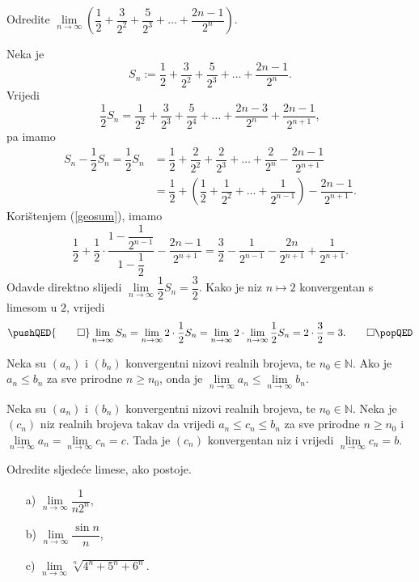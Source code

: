\begin{exercise}
Odredite $\lim\limits_{n\to \infty}\left(\dfrac{1}{2}+\dfrac{3}{2^2}+\dfrac{5}{2^3}+\dots+\dfrac{2n-1}{2^n}\right)$.
\end{exercise}
\begin{proof*}
Neka je
$$S_n:=\dfrac{1}{2}+\dfrac{3}{2^2}+\dfrac{5}{2^3}+\dots+\dfrac{2n-1}{2^n}.$$
Vrijedi
$$\dfrac{1}{2}S_n=\dfrac{1}{2^2}+\dfrac{3}{2^3}+\dfrac{5}{2^4}+\dots+\dfrac{2n-3}{2^{n}}+\dfrac{2n-1}{2^{n+1}},$$
pa imamo
\begin{align*}
S_n-\dfrac{1}{2}S_n=\dfrac{1}{2}S_n&=\dfrac{1}{2}+\dfrac{2}{2^2}+\dfrac{2}{2^3}+\dots+\dfrac{2}{2^n}-\dfrac{2n-1}{2^{n+1}}\\
&=\dfrac{1}{2}+\left(\dfrac{1}{2}+\dfrac{1}{2^2}+\dots+\dfrac{1}{2^{n-1}}\right)-\dfrac{2n-1}{2^{n+1}}.
\end{align*}
Korištenjem (\ref{geosum}), imamo
$$\dfrac{1}{2}+\dfrac{1}{2}\cdot\dfrac{1-\dfrac{1}{2^{n-1}}}{1-\dfrac{1}{2}}-\dfrac{2n-1}{2^{n+1}}=\dfrac{3}{2}-\dfrac{1}{2^{n-1}}-\dfrac{2n}{2^{n+1}}+\dfrac{1}{2^{n+1}}.$$
Odavde direktno slijedi $\lim\limits_{n\to \infty}{\dfrac{1}{2}S_n}=\dfrac{3}{2}$. Kako je niz $n\mapsto 2$ konvergentan s limesom u $2$, vrijedi
\[
\pushQED{\qed}
\lim\limits_{n\to \infty}{S_n}=\lim\limits_{n\to \infty}{2\cdot \dfrac{1}{2}S_n}=\lim\limits_{n\to \infty}{2}\cdot \lim\limits_{n\to \infty}{\dfrac{1}{2}S_n}=2\cdot \dfrac{3}{2}=3.\qedhere
\popQED
\]
\end{proof*}
\begin{remark}
\label{limitpreservesordering}
Neka su $(a_n)$ i $(b_n)$ konvergentni nizovi realnih brojeva, te $n_0\in \mathbb{N}$. Ako je $a_n\leq b_n$ za sve prirodne $n\geq n_0$, onda je $\lim\limits_{n\to \infty}{a_n}\leq \lim\limits_{n\to \infty}{b_n}$.
\end{remark}
\begin{remark} 
Neka su $(a_n)$ i $(b_n)$ konvergentni nizovi realnih brojeva, te $n_0\in \mathbb{N}$. Neka je $(c_n)$ niz realnih brojeva takav da vrijedi $a_n\leq c_n\leq b_n$ za sve prirodne $n\geq n_0$ i $\lim\limits_{n\to \infty}{a_n}=\lim\limits_{n\to \infty}{c_n}=c$. Tada je $(c_n)$ konvergentan niz i vrijedi $\lim\limits_{n\to \infty}{c_n}=b$.
\end{remark}
\begin{exercise} Odredite sljedeće limese, ako postoje.
\begin{itemize}
\item[a)] $\lim\limits_{n\to \infty}{\dfrac{1}{n2^n}}$,
\item[b)] $\lim\limits_{n\to \infty}{\dfrac{\sin{n}}{n}}$,
\item[c)] $\lim\limits_{n\to \infty}{\sqrt[n]{4^n+5^n+6^n}}$.
\end{itemize}
\end{exercise}
